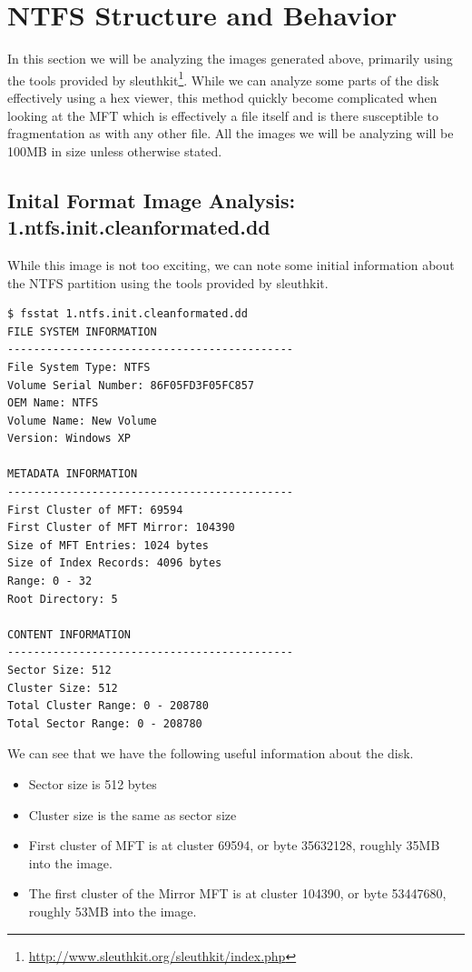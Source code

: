 \documentclass[a4paper,
    11pt,
    normalheadings,
    parindent,
    UKenglish,
    abstracton,
    ]{scrartcl}
\begin{document}
\section{NTFS Structure and Behavior}
In this section we will be analyzing the images generated above, primarily using the tools provided by sleuthkit\footnote{\url{http://www.sleuthkit.org/sleuthkit/index.php}}. While we can analyze some parts of the disk effectively using a hex viewer, this method quickly become complicated when looking at the MFT which is effectively a file itself and is there susceptible to fragmentation as with any other file.
All the images we will be analyzing will be 100MB in size unless otherwise stated.

\subsection{Inital Format Image Analysis: 1.ntfs.init.cleanformated.dd }
While this image is not too exciting, we can note some initial information about the NTFS partition using the tools provided by sleuthkit.

\begin{verbatim}
$ fsstat 1.ntfs.init.cleanformated.dd
FILE SYSTEM INFORMATION
--------------------------------------------
File System Type: NTFS
Volume Serial Number: 86F05FD3F05FC857
OEM Name: NTFS
Volume Name: New Volume
Version: Windows XP

METADATA INFORMATION
--------------------------------------------
First Cluster of MFT: 69594
First Cluster of MFT Mirror: 104390
Size of MFT Entries: 1024 bytes
Size of Index Records: 4096 bytes
Range: 0 - 32
Root Directory: 5

CONTENT INFORMATION
--------------------------------------------
Sector Size: 512
Cluster Size: 512
Total Cluster Range: 0 - 208780
Total Sector Range: 0 - 208780
\end{verbatim}
We can see that we have the following useful information about the disk.
\begin{itemize}
        \item Sector size is 512 bytes
        \item Cluster size is the same as sector size
        \item First cluster of MFT is at cluster 69594, or byte 35632128, roughly 35MB into the image.
        \item The first cluster of the Mirror MFT is at cluster 104390, or byte 53447680, roughly 53MB into the image.
\end{itemize}
\end{document}
